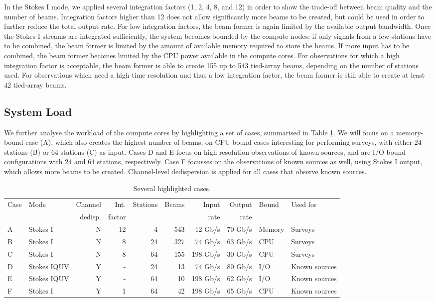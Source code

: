 \documentclass{llncs}
\begin{document}
In the Stokes I mode, we applied several integration factors (1, 2, 4, 8, and 12) in order to show the trade-off between beam quality and the number of beams. Integration factors higher than 12 does not allow significantly more beams to be created, but could be used in order to further reduce the total output rate. For low integration factors, the beam former is again limited by the available output bandwidth. Once the Stokes I streams are integrated sufficiently, the system becomes bounded by the compute nodes: if only signals from a few stations have to be combined, the beam former is limited by the amount of available memory required to store the beams. If more input has to be combined, the beam former becomes limited by the CPU power available in the compute cores. For observations for which a high integration factor is acceptable, the beam former is able to create 155 up to 543 tied-array beams, depending on the number of stations used. For observations which need a high time resolution and thus a low integration factor, the beam former is still able to create at least 42 tied-array beams.

\subsection{System Load}

We further analyse the workload of the compute cores by highlighting a set of cases, summarised in Table \ref{table:cases}. We will focus on a memory-bound case (A), which also creates the highest number of beams, on CPU-bound cases interesting for performing surveys, with either 24 stations (B) or 64 stations (C) as input. Cases D and E focus on high-resolution observations of known sources, and are I/O bound configurations with 24 and 64 stations, respectively. Case F focusses on the observations of known sources as well, using Stokes I output, which allows more beams to be created. Channel-level dedispersion is applied for all cases that observe known sources.

\begin{table}[ht]
\center
\begin{tabular}{l|l|r|r|r|r|r|r|l|l}
Case & Mode & Channel & Int. & Stations & Beams  & Input & Output & Bound & Used for \\
     &      & dedisp. & factor      &          &        & rate  & rate   &       & \\
\hline
\hline
A & Stokes I    & N & 12 &  4 & 543 &  12 Gb/s & 70 Gb/s & Memory & Surveys \\
B & Stokes I    & N &  8 & 24 & 327 &  74 Gb/s & 63 Gb/s & CPU   & Surveys \\
C & Stokes I    & N &  8 & 64 & 155 & 198 Gb/s & 30 Gb/s & CPU   & Surveys \\  
D & Stokes IQUV & Y & - & 24 &  13 &  74 Gb/s & 80 Gb/s & I/O   & Known sources \\
E & Stokes IQUV & Y & - & 64 &  10 & 198 Gb/s & 62 Gb/s & I/O   & Known sources \\
F & Stokes I    & Y & 1 & 64 &  42 & 198 Gb/s & 65 Gb/s & CPU   & Known sources 
\end{tabular}
\caption{Several highlighted cases.}
\label{table:cases}
\end{table}
\end{document}
